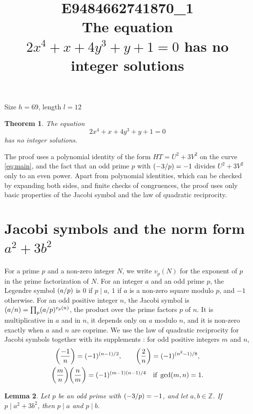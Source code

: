 \documentclass[11pt]{article}
\title{\textbf{E9484662741870\_1}\\[4pt] {\Large The equation $2x^{4}+x+4y^{3}+y+1=0$ has no integer solutions}}
\author{}
\date{}
\newtheorem{theorem}{Theorem}
\newtheorem{lemma}[theorem]{Lemma}
\newcommand{\Z}{\mathbb{Z}}
\newcommand{\leg}[2]{\mathchoice{\biggl(\dfrac{#1}{#2}\biggr)}{(#1/#2)}{(#1/#2)}{(#1/#2)}}
\begin{document}
\maketitle
\vspace{-8ex}
\begin{center}
Size $h=69$, length $l=12$
\end{center}

\begin{theorem}\label{thm:main}
The equation
\begin{equation}\label{eq:main}
2x^{4}+x+4y^{3}+y+1=0
\end{equation}
has no integer solutions.
\end{theorem}

The proof uses a polynomial identity of the form $HT=U^2+3V^2$ on the curve \eqref{eq:main}, and the fact that an odd prime $p$ with $\leg{-3}{p}=-1$ divides $U^2+3V^2$ only to an even power. Apart from polynomial identities, which can be checked by expanding both sides, and finite checks of congruences, the proof uses only basic properties of the Jacobi symbol and the law of quadratic reciprocity.

\section{\texorpdfstring{Jacobi symbols and the norm form $a^2+3b^2$}{Jacobi symbols and the norm form}}

For a prime $p$ and a non-zero integer $N$, we write $v_p(N)$ for the exponent of $p$ in the prime factorization of $N$. For an integer $a$ and an odd prime $p$, the Legendre symbol $\leg{a}{p}$ is $0$ if $p\mid a$, $1$ if $a$ is a non-zero square modulo $p$, and $-1$ otherwise. For an odd positive integer $n$, the Jacobi symbol is $\leg{a}{n}=\prod_p\leg{a}{p}^{v_p(n)}$, the product over the prime factors $p$ of $n$. It is multiplicative in $a$ and in $n$, it depends only on $a$ modulo $n$, and it is non-zero exactly when $a$ and $n$ are coprime. We use the law of quadratic reciprocity for Jacobi symbols together with its supplements \cite[Chapter~5, \S2]{IR}: for odd positive integers $m$ and $n$,
\begin{gather*}
\leg{-1}{n}=(-1)^{(n-1)/2},\qquad\leg{2}{n}=(-1)^{(n^2-1)/8},\\
\leg{m}{n}\leg{n}{m}=(-1)^{(m-1)(n-1)/4}\quad\text{if }\gcd(m,n)=1.
\end{gather*}

\begin{lemma}\label{lem:divides}
Let $p$ be an odd prime with $\leg{-3}{p}=-1$, and let $a,b\in\Z$. If $p\mid a^2+3b^2$, then $p\mid a$ and $p\mid b$.
\end{lemma}
\end{document}
